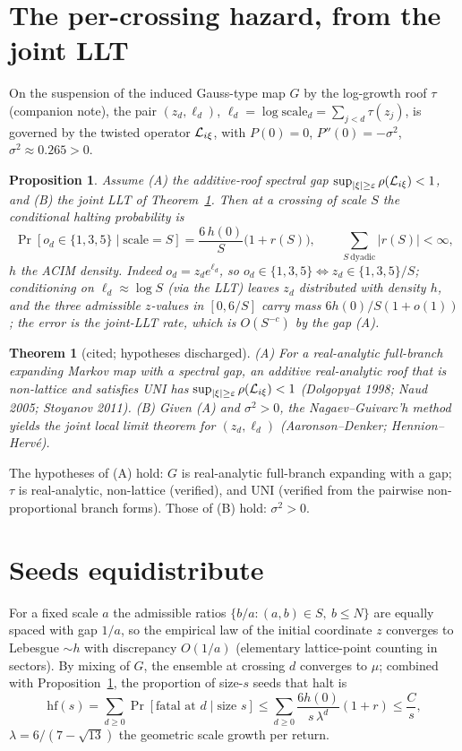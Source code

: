 \documentclass[11pt]{article}
\newtheorem{theorem}{Theorem}\newtheorem{lemma}{Lemma}\newtheorem{proposition}{Proposition}
\theoremstyle{remark}\newtheorem{remark}{Remark}
\begin{document}
\section{The per-crossing hazard, from the joint LLT}
On the suspension of the induced Gauss-type map $G$ by the log-growth roof
$\tau$ (companion note), the pair $(z_d,\ell_d)$, $\ell_d=\log\mathrm{scale}_d
=\sum_{j<d}\tau(z_j)$, is governed by the twisted operator $\mathcal L_{i\xi}$, with
$P(0)=0$, $P''(0)=-\sigma^2$, $\sigma^2\approx0.265>0$.
\begin{proposition}\label{p:hazard}
Assume \textnormal{(A)} the additive-roof spectral gap
$\sup_{|\xi|\ge\varepsilon}\rho(\mathcal L_{i\xi})<1$, and \textnormal{(B)} the joint
LLT of Theorem~\ref{t:cited}. Then at a crossing of scale $S$ the conditional
halting probability is
\[
\Pr[o_d\in\{1,3,5\}\mid \mathrm{scale}=S]=\frac{6\,h(0)}{S}\big(1+r(S)\big),
\qquad \sum_{S\ \mathrm{dyadic}} |r(S)| <\infty,
\]
$h$ the ACIM density. Indeed $o_d=z_d e^{\ell_d}$, so $o_d\in\{1,3,5\}\iff
z_d\in\{1,3,5\}/S$; conditioning on $\ell_d\approx\log S$ (via the LLT) leaves
$z_d$ distributed with density $h$, and the three admissible $z$-values in
$[0,6/S]$ carry mass $6h(0)/S(1+o(1))$; the error is the joint-LLT rate, which
is $O(S^{-c})$ by the gap \textnormal{(A)}.
\end{proposition}

\begin{theorem}[cited; hypotheses discharged]\label{t:cited}
\emph{(A)} For a real-analytic full-branch expanding Markov map with a
spectral gap, an additive real-analytic roof that is non-lattice and satisfies
UNI has $\sup_{|\xi|\ge\varepsilon}\rho(\mathcal L_{i\xi})<1$
\emph{(Dolgopyat 1998; Naud 2005; Stoyanov 2011)}. \emph{(B)} Given \emph{(A)}
and $\sigma^2>0$, the Nagaev--Guivarc'h method yields the joint local limit
theorem for $(z_d,\ell_d)$ \emph{(Aaronson--Denker; Hennion--Herv\'e)}.
\end{theorem}
The hypotheses of (A) hold: $G$ is real-analytic full-branch expanding with a
gap; $\tau$ is real-analytic, non-lattice (verified), and UNI (verified from
the pairwise non-proportional branch forms). Those of (B) hold: $\sigma^2>0$.

\section{Seeds equidistribute}
For a fixed scale $a$ the admissible ratios $\{b/a:(a,b)\in S,\ b\le N\}$ are
equally spaced with gap $1/a$, so the empirical law of the initial coordinate
$z$ converges to Lebesgue $\sim h$ with discrepancy $O(1/a)$ (elementary
lattice-point counting in sectors). By mixing of $G$, the ensemble at crossing
$d$ converges to $\mu$; combined with Proposition~\ref{p:hazard}, the
proportion of size-$s$ seeds that halt is
\[
\mathrm{hf}(s)=\sum_{d\ge0}\Pr[\text{fatal at }d\mid\text{size }s]
\le \sum_{d\ge0}\frac{6h(0)}{s\,\lambda^{d}}(1+r)\le \frac{C}{s},
\]
$\lambda=6/(7-\sqrt{13})$ the geometric scale growth per return.
\end{document}
